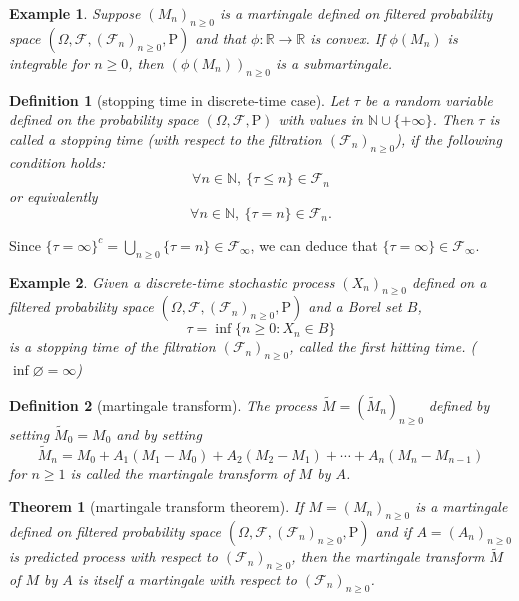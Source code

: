 \documentclass{report}
\newtheorem{definition}{Definition}[section]
\newtheorem{example}{Example}[section]
\newtheorem{theorem}{Theorem}[section]
\theoremstyle{nonumberplain}
\begin{document}
\begin{example}
	Suppose $(M_n)_{n\ge 0}$ is a martingale defined on filtered probability space $(\Omega,\mathcal{F},(\mathcal{F}_{n})_{n\ge0},\mathrm{P})$ and that $\phi:\mathbb{R}\to\mathbb{R}$ is convex. If $\phi(M_n)$ is integrable for $n\ge0$, then $\left(\phi(M_n)\right)_{n\ge 0}$ is a submartingale.
\end{example}

\begin{definition}[stopping time in discrete-time case]
	Let $\tau$  be a random variable defined on the probability space $(\Omega,\mathcal{F},\mathrm{P})$ with values in $\mathbb{N}\cup\{+\infty\}$. Then $\tau$ is called a stopping time (with respect to the filtration $(\mathcal{F}_{n})_{n\ge 0}$), if the following condition holds:
	\[
	\forall n\in\mathbb{N},\ \{\tau \le n\}\in {\mathcal {F}}_{n}
	\]
	or equivalently
	\[
	\forall n\in\mathbb{N},\ \{\tau =n\}\in {\mathcal {F}}_{n}.
	\]
\end{definition}
Since $\{\tau=\infty\}^{c}=\bigcup\limits_{n\ge0}\{\tau=n\} \in \mathcal{F}_{\infty}$, we can deduce that $\{\tau=\infty\}\in \mathcal{F}_{\infty}$.
\begin{example}
	Given a discrete-time stochastic process $(X_{n})_{n\ge 0}$ defined on a filtered probability space $(\Omega,\mathcal{F},(\mathcal{F}_{n})_{n\ge0 },\mathrm{P})$ and a Borel set $B$,
	\[
	\tau=\inf\{n\ge0:X_n\in B\}
	\]
	is a stopping time of the filtration $(\mathcal{F}_{n})_{n\ge0 }$, called the \emph{first hitting time}. ($\inf\varnothing = \infty $)
\end{example}

\begin{definition}[martingale transform]
The process $\widetilde{M}=(\widetilde{M}_{n})_{n\ge0}$ defined by setting $\widetilde{M}_{0}=M_{0}$ and by setting
\[
\widetilde{M}_{n}=M_{0}+A_{1}\left(M_{1}-M_{0}\right)+A_{2}\left(M_{2}-M_{1}\right)+\cdots+A_{n}\left(M_{n}-M_{n-1}\right)
\]
for $n \geq 1$ is called the martingale transform of $M$ by $A$.
\end{definition}

\begin{theorem}[martingale transform theorem]
If $M=(M_{n})_{n\ge0}$ is a martingale defined on filtered probability space $(\Omega,\mathcal{F},(\mathcal{F}_{n})_{n\ge0},\mathrm{P})$ and if $A=(A_{n})_{n\ge0}$ is predicted process with respect to $(\mathcal{F}_{n})_{n\ge0}$, then the martingale transform $\widetilde{M}$ of $M$ by $A$ is itself a martingale with respect to $(\mathcal{F}_{n})_{n\ge0}$.
\end{theorem}
\end{document}
